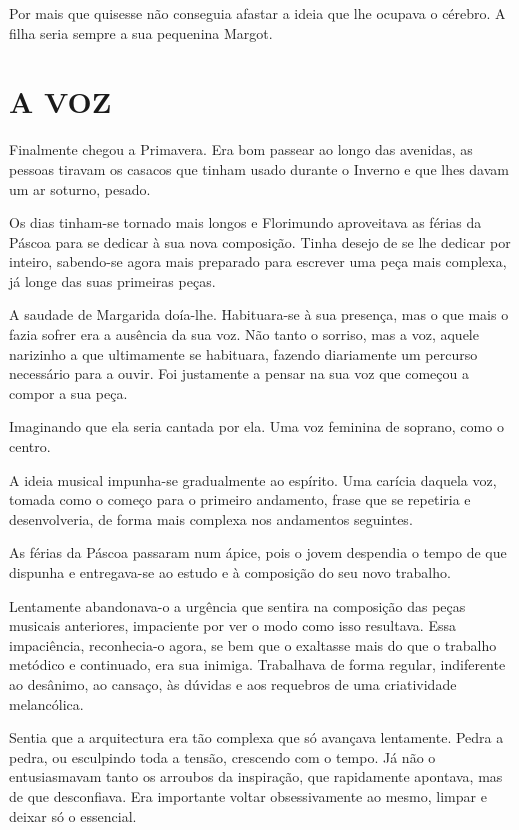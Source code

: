 Por mais que quisesse não conseguia afastar a ideia que lhe ocupava o
cérebro. A filha seria sempre a sua pequenina Margot.

\section{\textbf{A VOZ}}

Finalmente chegou a Primavera. Era bom passear ao longo das avenidas, as
pessoas tiravam os casacos que tinham usado durante o Inverno e que lhes
davam um ar soturno, pesado.

Os dias tinham-se tornado mais longos e Florimundo aproveitava as férias
da Páscoa para se dedicar à sua nova composição. Tinha desejo de se lhe
dedicar por inteiro, sabendo-se agora mais preparado para escrever uma
peça mais complexa, já longe das suas primeiras peças.

A saudade de Margarida doía-lhe. Habituara-se à sua presença, mas o que
mais o fazia sofrer era a ausência da sua voz. Não tanto o sorriso, mas
a voz, aquele narizinho a que ultimamente se habituara, fazendo
diariamente um percurso necessário para a ouvir. Foi justamente a pensar
na sua voz que começou a compor a sua peça.

Imaginando que ela seria cantada por ela. Uma voz feminina de soprano,
como o centro.

A ideia musical impunha-se gradualmente ao espírito. Uma carícia daquela
voz, tomada como o começo para o primeiro andamento, frase que se
repetiria e desenvolveria, de forma mais complexa nos andamentos
seguintes.

As férias da Páscoa passaram num ápice, pois o jovem despendia o tempo
de que dispunha e entregava-se ao estudo e à composição do seu novo
trabalho.

Lentamente abandonava-o a urgência que sentira na composição das peças
musicais anteriores, impaciente por ver o modo como isso resultava. Essa
impaciência, reconhecia-o agora, se bem que o exaltasse mais do que o
trabalho metódico e continuado, era sua inimiga. Trabalhava de forma
regular, indiferente ao desânimo, ao cansaço, às dúvidas e aos requebros
de uma criatividade melancólica.

Sentia que a arquitectura era tão complexa que só avançava lentamente.
Pedra a pedra, ou esculpindo toda a tensão, crescendo com o tempo. Já
não o entusiasmavam tanto os arroubos da inspiração, que rapidamente
apontava, mas de que desconfiava. Era importante voltar obsessivamente
ao mesmo, limpar e deixar só o essencial.

